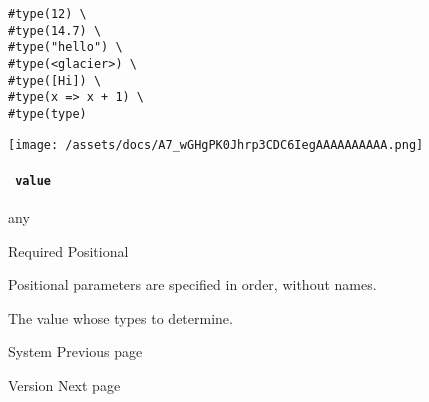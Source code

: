 \begin{verbatim}
#type(12) \
#type(14.7) \
#type("hello") \
#type(<glacier>) \
#type([Hi]) \
#type(x => x + 1) \
#type(type)
\end{verbatim}

\texttt{[image: /assets/docs/A7\_wGHgPK0Jhrp3CDC6IegAAAAAAAAAA.png]}

\paragraph{\texorpdfstring{\texttt{\ value\ }}{ value }}\label{constructor-value}

{ any }

{Required} {{ Positional }}

\phantomsection\label{constructor-value-positional-tooltip}
Positional parameters are specified in order, without names.

The value whose type\textquotesingle s to determine.

\href{/docs/reference/foundations/sys/}{\pandocbounded{}}

{ System } { Previous page }

\href{/docs/reference/foundations/version/}{\pandocbounded{}}

{ Version } { Next page }
